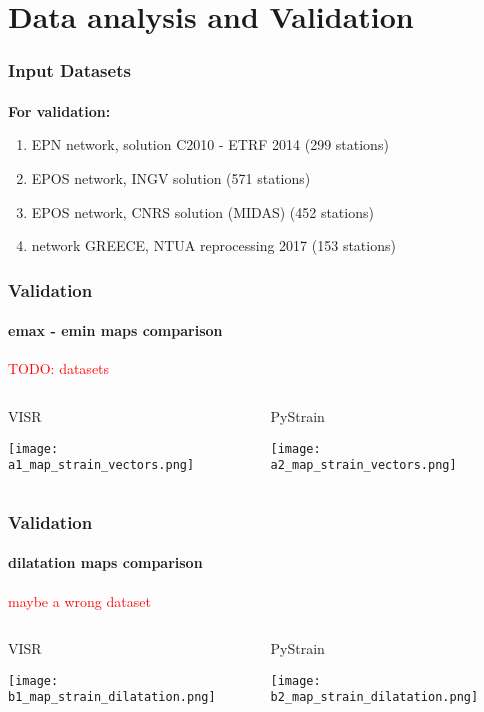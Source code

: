 \section{Data analysis and Validation}

\graphicspath{{Chapter3/Figs/}}

\begin{frame}
  \frametitle{Input Datasets}
  \framesubtitle{}
  \label{ch3:data}
  
  \textbf{For validation:}
  \begin{enumerate}
    \item EPN network, solution C2010 - ETRF 2014 (299 stations)
    \item EPOS network, INGV solution (571 stations)
    \item EPOS network, CNRS solution (MIDAS) (452 stations)
    \item network GREECE, NTUA reprocessing 2017 (153 stations)
  \end{enumerate}
    
\end{frame}
\note{}

\begin{frame}
  \frametitle{Validation}
  \framesubtitle{emax - emin maps comparison}
  \label{ch3:data}
  \textcolor{red}{TODO: datasets}
  \begin{columns}
    \begin{column}{0.5\textwidth}
      VISR
      
      \texttt{[image: a1\_map\_strain\_vectors.png]}   
    \end{column}
    \begin{column}{0.5\textwidth}
    \begin{center}
      PyStrain
      
      \texttt{[image: a2\_map\_strain\_vectors.png]}     
    \end{center}
    \end{column}
  \end{columns}

\end{frame}
\note{}

\begin{frame}
  \frametitle{Validation}
  \framesubtitle{dilatation maps comparison}
  \label{ch3:data}
  \textcolor{red}{maybe a wrong dataset}
  \begin{columns}
    \begin{column}{0.5\textwidth}
      VISR
      
      \texttt{[image: b1\_map\_strain\_dilatation.png]}   
    \end{column}
    \begin{column}{0.5\textwidth}
    \begin{center}
      PyStrain
      
      \texttt{[image: b2\_map\_strain\_dilatation.png]}     
    \end{center}
    \end{column}
  \end{columns}

\end{frame}
\note{}


